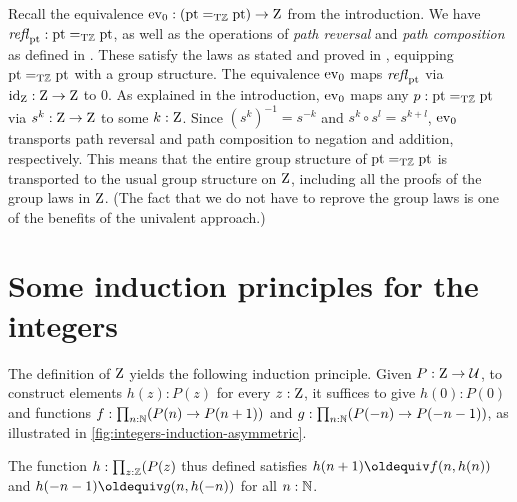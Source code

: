 \documentclass[a4paper,12pt]{amsart}
\begin{document}

Recall the equivalence $\mathrm{ev}_0 : ({\mathord{\mathrm{pt}}}=_{\mathrm{T}\mathbb{Z}} {\mathord{\mathrm{pt}}})\to\mathrm{Z}$ from the introduction.
We have $\mathop{{\it refl}_{{\mathord{\mathrm{pt}}}}} : {\mathord{\mathrm{pt}}}=_{\mathrm{T}\mathbb{Z}} {\mathord{\mathrm{pt}}}$, as well as the operations
of \emph{path reversal} and \emph{path composition} as defined
in \cite[Ch. 2.1]{hottbook}. These satisfy the laws as stated
and proved in \cite[Lemma 2.1.4]{hottbook}, equipping ${\mathord{\mathrm{pt}}}=_{\mathrm{T}\mathbb{Z}} {\mathord{\mathrm{pt}}}$
with a group structure.
The equivalence $\mathrm{ev}_0$ maps $\mathop{{\it refl}_{{\mathord{\mathrm{pt}}}}}$ via $\mathord{\mathrm{id}}_{\mathrm{Z}} : \mathrm{Z}\to\mathrm{Z}$ to $0$.
As explained in the introduction, $\mathrm{ev}_0$ maps any $p : {\mathord{\mathrm{pt}}}=_{\mathrm{T}\mathbb{Z}} {\mathord{\mathrm{pt}}}$
via $s^k : \mathrm{Z}\to\mathrm{Z}$ to some $k:\mathrm{Z}$. Since $(s^k)^{-1} = s^{-k}$
and $s^k \circ s^l = s^{k+l}$, $\mathrm{ev}_0$ transports path reversal 
and path composition to negation and addition, respectively.
This means that the entire group structure of ${\mathord{\mathrm{pt}}}=_{\mathrm{T}\mathbb{Z}} {\mathord{\mathrm{pt}}}$
is transported to the usual group structure on $\mathrm{Z}$,
including all the proofs of the group laws in $\mathrm{Z}$.
(The fact that we do not have to reprove the group laws
is one of the benefits of the univalent approach.)


\section{Some induction principles for the integers}
\label{sec:integers-induction}

The definition of $\mathrm{Z}$ yields the following induction principle.
Given $P : \mathrm{Z} \to \mathcal{U}$, to construct elements $h(z) : P(z)$ for every $z : \mathrm{Z}$,
it suffices to give $h(0): P(0)$ and functions
$f : \prod_{n:\mathbb{N}}(P(n) \to P(n+1))$ and
$g : \prod_{n:\mathbb{N}}(P(-n) \to P(-n-1))$, 
as illustrated in \cref{fig:integers-induction-asymmetric}.

The function $h:\prod_{z:\mathbb{Z}}(P(z)$ thus defined satisfies
$h(n+1)\jdeq f(n,h(n))$ and $h(-n-1)\jdeq g(n,h(-n))$ for all $n:\mathbb{N}$.
\end{document}
